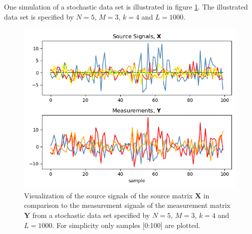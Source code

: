 One simulation of a stochastic data set is illustrated in figure \ref{fig:AR}. The illustrated data set is specified by $N = 5$, $M = 3$, $k = 4$ and $L = 1000$.
\begin{figure}[H]
\centering
\includegraphics[scale=0.5]{figures/ch_6/AR_data.png}
\caption{Visualization of the source signals of the source matrix $\mathbf{X}$ in comparison to the measurement signals of the measurement matrix $\mathbf{Y}$ from a stochastic data set specified by $N = 5$, $M = 3$, $k = 4$ and $L=1000$. For simplicity only samples [0:100] are plotted.}
\label{fig:AR}
\end{figure}
\noindent

